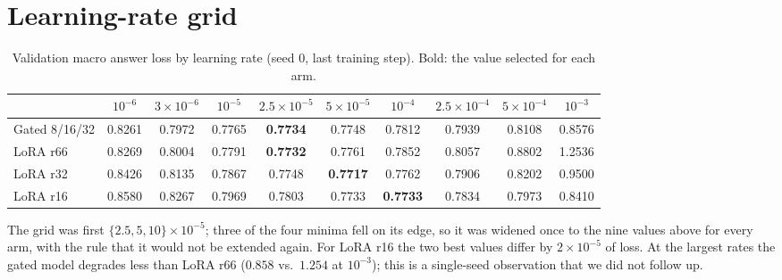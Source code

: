\documentclass[11pt]{article}
\begin{document}



\appendix
\section{Learning-rate grid}
\label{app:lr}
\begin{table}[h]
\centering
\small
\caption{Validation macro answer loss by learning rate (seed 0, last training step). Bold: the
value selected for each arm.}
\setlength{\tabcolsep}{3.5pt}
\begin{tabular}{lccccccccc}
\toprule
 & $10^{-6}$ & $3{\times}10^{-6}$ & $10^{-5}$ & $2.5{\times}10^{-5}$ & $5{\times}10^{-5}$ & $10^{-4}$ & $2.5{\times}10^{-4}$ & $5{\times}10^{-4}$ & $10^{-3}$ \\
\midrule
Gated 8/16/32 & 0.8261 & 0.7972 & 0.7765 & \textbf{0.7734} & 0.7748 & 0.7812 & 0.7939 & 0.8108 & 0.8576 \\
LoRA r66      & 0.8269 & 0.8004 & 0.7791 & \textbf{0.7732} & 0.7761 & 0.7852 & 0.8057 & 0.8802 & 1.2536 \\
LoRA r32      & 0.8426 & 0.8135 & 0.7867 & 0.7748 & \textbf{0.7717} & 0.7762 & 0.7906 & 0.8202 & 0.9500 \\
LoRA r16      & 0.8580 & 0.8267 & 0.7969 & 0.7803 & 0.7733 & \textbf{0.7733} & 0.7834 & 0.7973 & 0.8410 \\
\bottomrule
\end{tabular}
\end{table}
The grid was first $\{2.5, 5, 10\}\times10^{-5}$; three of the four minima fell on its edge, so
it was widened once to the nine values above for every arm, with the rule that it would not be
extended again. For LoRA r16 the two best values differ by $2\times10^{-5}$ of loss. At the
largest rates the gated model degrades less than LoRA r66 ($0.858$ vs.\ $1.254$ at $10^{-3}$);
this is a single-seed observation that we did not follow up.
\end{document}

